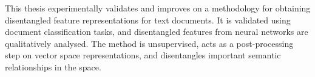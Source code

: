 This thesis experimentally validates and improves on a methodology for obtaining disentangled feature representations for text documents. It is validated using document classification tasks, and disentangled features from neural networks are  qualitatively  analysed. The method is unsupervised, acts as a post-processing step on vector space representations, and  disentangles important semantic relationships in the space.  













